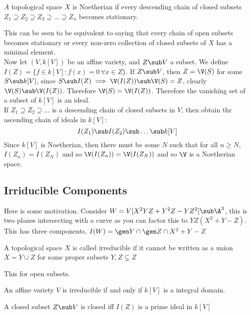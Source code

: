 \noindent
\begin{ndefi}
  $A$ topological space $X$ is Noetherian if every descending chain of closed subsets $Z_1 \supseteq Z_2 \supseteq Z_3 \supseteq \dots \supseteq Z_n$ becomes stationary.
\end{ndefi}
\noindent
This can be seen to be equivalent to saying that every chain of open subsets becomes stationary or every non-zero collection of closed subsets of $X$ has a minimal element.\\

\noindent
Now let $(V, k[V])$ be an affine variety, and $Z \sub V$ a subset. We define $I(Z) = \{f \in k[V] : f(x) = 0 \, \forall x \in Z\}$. If $Z \sub V$, then $Z = \V(S)$ for some $S \sub k[V]$, since $S \sub I(Z) \implies \V(I(Z)) \sub \V(S) = Z$, clearly $\V(S) \sub \V(I(Z))$. Therefore $\V(S) = \V(I(Z))$. Therefore the vanishing set of a subset of $k[V]$ is an ideal. \\

\noindent
If $Z_1 \supseteq Z_2 \supseteq \dots$ is a descending chain of closed subsets in $V$, then obtain thr ascending chain of ideals in $k[V]$:
$$ I(Z_1) \sub I(Z_2) \sub \dots \sub k[V] $$
Since $k[V]$ is Noetherian, then there must be some $N$ such that for all $n \ge N$, $I(Z_n) = I(Z_N)$ and so $\V(I(Z_n)) = \V(I(Z_N))$ and so $\V$ is a Noetherian space.\\

\noindent
\subsection{Irriducible Components}
Here is some motivation. Consider $W = V[X^2YZ + Y^2Z - YZ^2] \sub \A^3$, this is two planes intersecting with a curve as you can factor this to $YZ(X^2 + Y - Z)$. This has three components, $I(W) = \gen Y \cap \gen Z \cap {X^2 + Y - Z}$

\begin{ndefi}[Irreducible]
  A topological space $X$ is called irreducible if it cannot be written as a union $X = Y \cup Z$ for some proper subsets $Y, Z \subsetneq Z$
\end{ndefi}

\begin{exercise}
  This for open subsets.
\end{exercise}
\begin{exercise}
  An affine variety $V$ is irreducible if and only if $k[V]$ is a integral domain.
\end{exercise}
\noindent
A closed subset $Z \sub V$ is closed iff $I(Z)$  is a prime ideal in $k[V]$

